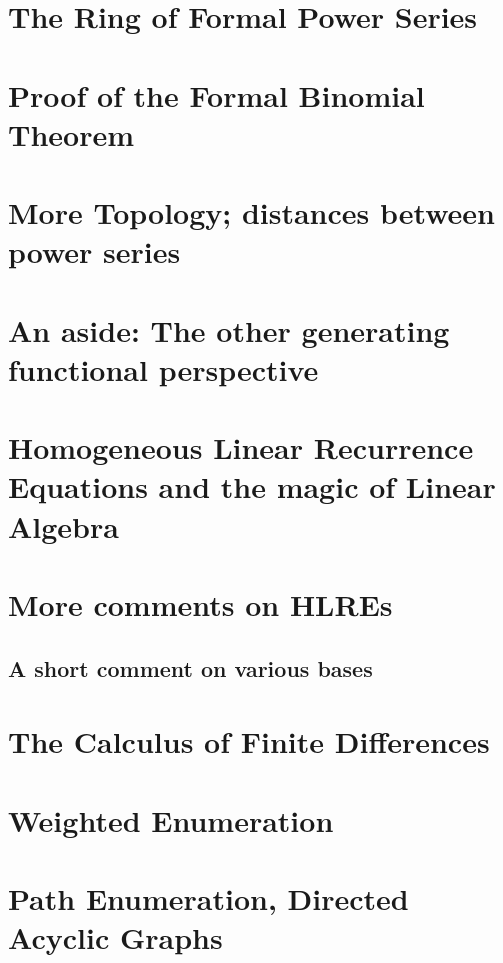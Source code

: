 




\section{The Ring of Formal Power Series}

\section{Proof of the Formal Binomial Theorem}

\section{More Topology; distances between power series}

\section{An aside: The other generating functional perspective}


\section{Homogeneous Linear Recurrence Equations and the magic of Linear Algebra}

\section{More comments on HLREs}

\subsection{A short comment on various bases}

\section{The Calculus of Finite Differences}

\section{Weighted Enumeration}

\section{Path Enumeration, Directed Acyclic Graphs}

